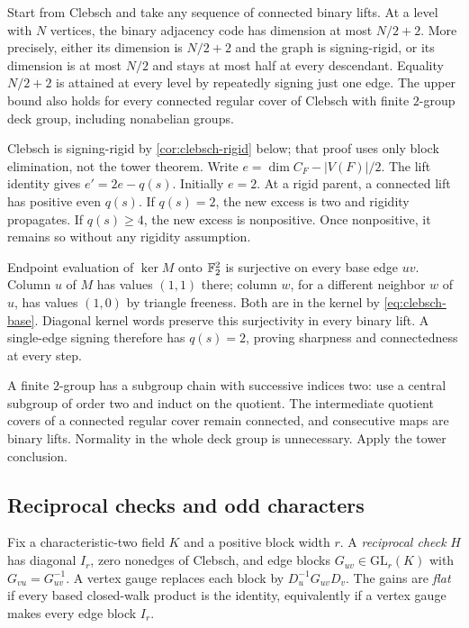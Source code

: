 \begin{theorem}\label{thm:clebsch-towers}
\notformalized
Start from Clebsch and take any sequence of connected binary lifts.
At a level with $N$ vertices, the binary adjacency code has dimension
at most $N/2+2$. More precisely, either its dimension is $N/2+2$ and
the graph is signing-rigid, or its dimension is at most $N/2$ and stays
at most half at every descendant. Equality $N/2+2$ is attained at
every level by repeatedly signing just one edge. The upper bound also
holds for every connected regular cover of Clebsch with finite
$2$-group deck group, including nonabelian groups.
\end{theorem}
\begin{informalproof}
Clebsch is signing-rigid by \cref{cor:clebsch-rigid} below; that proof
uses only block elimination, not the tower theorem. Write
$e=\dim C_F-|V(F)|/2$. The lift identity gives $e'=2e-q(s)$.
Initially $e=2$. At a rigid parent, a connected lift has positive even
$q(s)$. If $q(s)=2$, the new excess is two and rigidity propagates.
If $q(s)\ge4$, the new excess is nonpositive. Once nonpositive, it
remains so without any rigidity assumption.

Endpoint evaluation of $\ker M$ onto $\mathbb{F}_2^2$ is surjective on every
base edge $uv$. Column $u$ of $M$ has values $(1,1)$ there; column $w$,
for a different neighbor $w$ of $u$, has values $(1,0)$ by triangle
freeness. Both are in the kernel by \eqref{eq:clebsch-base}. Diagonal
kernel words preserve this surjectivity in every binary lift. A
single-edge signing therefore has $q(s)=2$, proving sharpness and
connectedness at every step.

A finite $2$-group has a subgroup chain with successive indices two:
use a central subgroup of order two and induct on the quotient.
The intermediate quotient covers of a connected regular cover remain
connected, and consecutive maps are binary lifts. Normality in the
whole deck group is unnecessary. Apply the tower conclusion.
\end{informalproof}

\subsection{Reciprocal checks and odd characters}
Fix a characteristic-two field $K$ and a positive block width $r$.
A \emph{reciprocal check} $H$ has diagonal $I_r$, zero nonedges of
Clebsch, and edge blocks $G_{uv}\in\mathrm{GL}_r(K)$ with
$G_{vu}=G_{uv}^{-1}$. A vertex gauge replaces each block by
$D_u^{-1}G_{uv}D_v$. The gains are \emph{flat} if every based
closed-walk product is the identity, equivalently if a vertex gauge
makes every edge block $I_r$.

